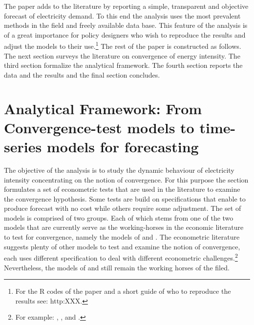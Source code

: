 \documentclass[]{amsart}
\begin{document}
\bigskip

The paper adds to the literature by reporting a simple, transparent and objective forecast of electricity demand. To this end the analysis uses the most prevalent methods in the field and freely available data base. This feature of the analysis is of a great importance for policy designers who wish to reproduce the results and adjust the models to their use.\footnote{For the R codes of the paper and a short guide of who to reproduce the results see: http:XXX.} The rest of the paper is constructed as follows. The next section surveys the literature on convergence of energy intensity. The third section formalize the analytical framework. The fourth section reports the data and the results and the final section concludes.

\bigskip

\section{Analytical Framework: From Convergence-test models to time-series models for forecasting}

\bigskip

The objective of the analysis is to study the dynamic behaviour of electricity intensity concentrating on the notion of convergence. For this purpose the section formulates a set of econometric tests that are used in the literature to examine the convergence hypothesis. Some tests are build on specifications that enable to produce forecast with no cost while others require some adjustment. The set of models is comprised of two groups. Each of which stems from one of the two models that are currently serve as the working-horses in the economic literature to test for convergence, namely the models of \cite{barro1992convergence} and \cite{PhillipsSul2007}. The econometric literature suggests plenty of other models to test and examine the notion of convergence, each uses different specification to deal with different econometric challenges.\footnote{For example: \cite{lee2003minimum}, \cite{kapetanios2003testing}, and \cite{hansen2000sample}.} Nevertheless, the models of \cite{barro1992convergence} and \cite{PhillipsSul2007} still remain the working horses of the filed. 

\bigskip
\end{document}
